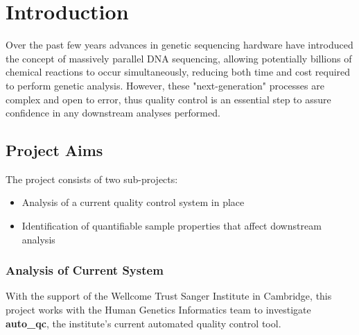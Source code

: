 \chapter{Introduction}
\ifpdf
    \graphicspath{{Chapter1/Figs/Raster/}{Chapter1/Figs/PDF/}{Chapter1/Figs/}}
\else
    \graphicspath{{Chapter1/Figs/Vector/}{Chapter1/Figs/}}
\fi


Over the past few years advances in genetic sequencing hardware have introduced
the concept of massively parallel DNA sequencing, allowing potentially billions
of chemical reactions to occur simultaneously, reducing both time and cost
required to perform genetic analysis\citep{HMG}. However, these
"next-generation" processes are complex and open to error\citep{Illumina}, thus
quality control is an essential step to assure confidence in any downstream
analyses performed.

\section{Project Aims}

The project consists of two sub-projects:

\begin{itemize}
    \item Analysis of a current quality control system in place
    \item Identification of quantifiable sample properties that affect downstream analysis
\end{itemize}


\subsection{Analysis of Current System}
With the support of the Wellcome Trust Sanger Institute in Cambridge, this
project works with the Human Genetics Informatics team to investigate
\textbf{auto\_qc}\citep{github:autoqc}, the institute's current automated
quality control tool.

